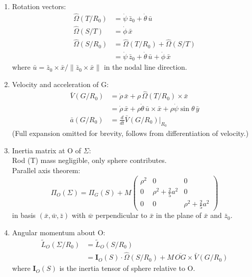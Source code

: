 \documentclass[12pt]{article}
\begin{document}
\newpage
\begin{answerbox}
\begin{enumerate}
    \item Rotation vectors:
    \begin{align*}
        \hat{\Omega}(T/R_0) &= \dot{\psi} \, \bar{z}_0 + \dot{\theta} \, \bar{u} \\
        \hat{\Omega}(S/T) &= \dot{\phi} \, \bar{x} \\
        \hat{\Omega}(S/R_0) &= \hat{\Omega}(T/R_0) + \hat{\Omega}(S/T) \\
        &= \dot{\psi} \, \bar{z}_0 + \dot{\theta} \, \bar{u} + \dot{\phi} \, \bar{x}
    \end{align*}
    where \( \bar{u} = \bar{z}_0 \times \bar{x} / \|\bar{z}_0 \times \bar{x}\| \) in the nodal line direction.

    \item Velocity and acceleration of G:
    \begin{align*}
        \bar{V}(G/R_0) &= \dot{\rho} \, \bar{x} + \rho \, \hat{\Omega}(T/R_0) \times \bar{x} \\
        &= \dot{\rho} \, \bar{x} + \rho \dot{\theta} \, \bar{u} \times \bar{x} + \rho \dot{\psi} \sin\theta \, \bar{y} \\
        \bar{a}(G/R_0) &= \frac{d}{dt}\bar{V}(G/R_0) \bigg|_{R_0}
    \end{align*}
    (Full expansion omitted for brevity, follows from differentiation of velocity.)

    \item Inertia matrix at O of \(\Sigma\): \\
    Rod (T) mass negligible, only sphere contributes. \\
    Parallel axis theorem:
    \[
        \Pi_O(\Sigma) = \Pi_G(S) + M \begin{pmatrix}
            \rho^2 & 0 & 0 \\
            0 & \rho^2 + \frac{2}{5}a^2 & 0 \\
            0 & 0 & \rho^2 + \frac{2}{5}a^2
        \end{pmatrix}
    \]
    in basis \( (\bar{x}, \bar{w}, \bar{z}) \) with \( \bar{w} \) perpendicular to \( \bar{x} \) in the plane of \( \bar{x} \) and \( \bar{z}_0 \).

    \item Angular momentum about O:
    \begin{align*}
        \tilde{L}_O(\Sigma/R_0) &= \tilde{L}_O(S/R_0) \\
        &= \mathbf{I}_O(S) \cdot \hat{\Omega}(S/R_0) + M \, \overline{OG} \times \bar{V}(G/R_0)
    \end{align*}
    where \( \mathbf{I}_O(S) \) is the inertia tensor of sphere relative to O.


\end{enumerate}
\end{answerbox}
\end{document}

